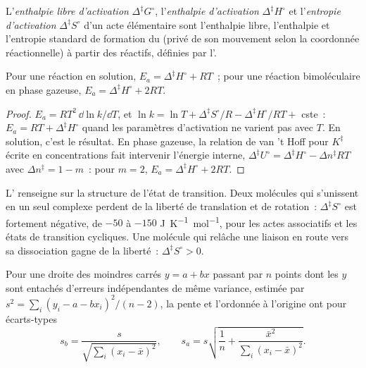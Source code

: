 \begin{definition}\label{def:b3:rate-theories:activation}
L'\emph{enthalpie libre d'activation}
$\Delta^{\ddagger}G^\circ$, l'\emph{enthalpie d'activation} $\Delta^{\ddagger}H^\circ$ et
l'\emph{entropie d'activation} $\Delta^{\ddagger}S^\circ$ d'un acte
élémentaire sont l'enthalpie libre, l'enthalpie et l'entropie standard
de formation du  (privé de son mouvement selon la
coordonnée réactionnelle) à partir des réactifs, définies par l'.
\end{definition}

\begin{proposition}\label{prop:b3:rate-theories:ea-dh}
Pour une réaction en solution, $E_a = \Delta^{\ddagger}H^\circ + RT$~;
pour une réaction bimoléculaire en phase gazeuse,
$E_a = \Delta^{\ddagger}H^\circ + 2RT$.
\end{proposition}

\begin{proof}
$E_a = RT^2\,\dd\ln k/\dd T$, et $\ln k = \ln T + \Delta^{\ddagger}S^\circ/R - \Delta^{\ddagger}H^\circ/RT + $ cste~: $E_a =
RT + \Delta^{\ddagger}H^\circ$ quand les paramètres d'activation ne
varient pas avec $T$. En solution, c'est le résultat. En phase gazeuse,
la relation de van 't Hoff pour $K^{\ddagger}$ écrite
en concentrations fait intervenir l'énergie interne,
$\Delta^{\ddagger}U^\circ = \Delta^{\ddagger}H^\circ - \Delta n^{\ddagger}RT$
avec $\Delta n^{\ddagger} = 1 - m$~: pour $m = 2$, $E_a = \Delta^{\ddagger}H^\circ + 2RT$.
\end{proof}

L' renseigne sur la structure de l'état de
transition. Deux molécules qui s'unissent en un seul complexe perdent de
la liberté de translation et de rotation~: $\Delta^{\ddagger}S^\circ$ est
fortement négative, de $-50$ à $-150$ \unit{J.K^{-1}.mol^{-1}}, pour les
actes associatifs et les états de transition cycliques. Une molécule qui
relâche une liaison en route vers sa dissociation gagne de la liberté~:
$\Delta^{\ddagger}S^\circ > 0$.

\begin{proposition}\label{prop:b3:rate-theories:slope-uncertainty}
Pour une droite des moindres carrés $y = a + bx$ passant par $n$ points
dont les $y$ sont entachés d'erreurs indépendantes de même variance,
estimée par $s^2 = \sum_i(y_i - a - bx_i)^2/(n - 2)$,
la pente et l'ordonnée à l'origine ont pour écarts-types
\[
  s_b = \frac{s}{\sqrt{\sum_i(x_i - \bar x)^2}}, \qquad
  s_a = s\sqrt{\frac1n + \frac{\bar x^2}{\sum_i(x_i - \bar x)^2}} .
\]
\end{proposition}

